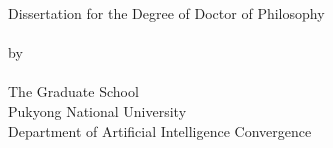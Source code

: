 \clearpage
\thispagestyle{titlingpage}

\noindent

\begin{center}

\vspace*{0cm}
{\huge Dissertation for the Degree of Doctor of Philosophy} \\
\vspace*{1.5cm}
{\huge \bfseries \titleEN} \\

\vspace{4.0cm}
{by}\\
{\LARGE \authorEN} \\

\vspace{0.5cm}
{\LARGE The Graduate School \\
	\vspace{-1ex}
	Pukyong National University \\
	\vspace{-1ex}
		Department of Artificial Intelligence Convergence \\}
\vspace{1.0cm}
{\Large \submitdate}


\end{center}
